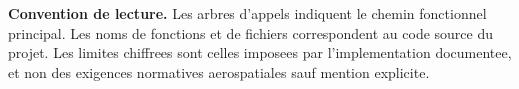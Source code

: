 \documentclass[11pt,a4paper]{article}
\begin{document}
\vfill
\textbf{Convention de lecture.} Les arbres d'appels indiquent le chemin fonctionnel principal. Les noms de fonctions et de fichiers correspondent au code source du projet. Les limites chiffrees sont celles imposees par l'implementation documentee, et non des exigences normatives aerospatiales sauf mention explicite.
\clearpage






\end{document}
